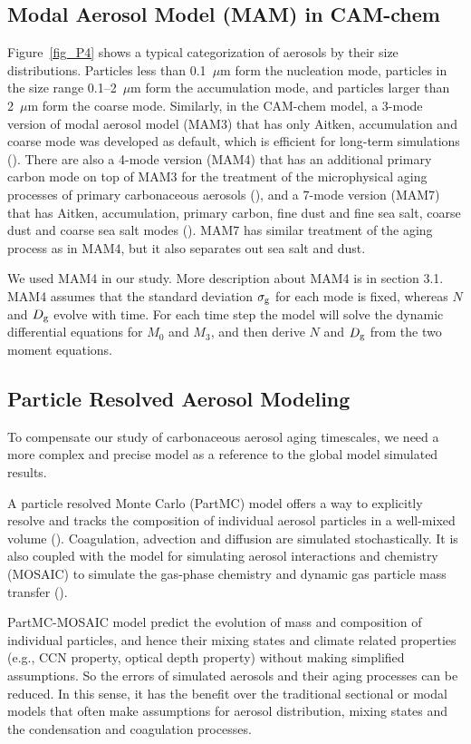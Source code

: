 \documentclass[12pt, fullpage]{uiucthesis2009}
\begin{document}
		\subsection{Modal Aerosol Model (MAM) in CAM-chem}
		Figure~\ref{fig_P4} shows a typical categorization of aerosols by their size distributions. Particles less than 0.1~$\mu$m form the nucleation mode, particles in the size range 0.1--2~$\mu$m form the accumulation mode, and particles larger than 2~$\mu$m form the coarse mode. Similarly, in the CAM-chem model, a 3-mode version of modal aerosol model (MAM3) that has only Aitken, accumulation and coarse mode was developed as default, which is efficient for long-term simulations (\cite{Liu2012}). There are also a 4-mode version (MAM4) that has an additional primary carbon mode on top of MAM3 for the treatment of the microphysical aging processes of primary carbonaceous aerosols (\cite{Liu2016}), and a 7-mode version (MAM7) that has Aitken, accumulation, primary carbon, fine dust and fine sea salt, coarse dust and coarse sea salt modes (\cite{Liu2012}). MAM7 has similar treatment of the aging process as in MAM4, but it also separates out sea salt and dust.
		
		We used MAM4 in our study. More description about MAM4 is in section 3.1. MAM4 assumes that the standard deviation $\sigma_{\rm g}$ for each mode is fixed, whereas $N$ and $D_{\rm g}$ evolve with time. For each time step the model will solve the dynamic differential equations for $M_0$ and $M_3$, and then derive $N$ and $D_{\rm g}$ from the two moment equations.
		
		\subsection{Particle Resolved Aerosol Modeling}
		To compensate our study of carbonaceous aerosol aging timescales, we need a more complex and precise model as a reference to the global model simulated results. 
		
		A particle resolved Monte Carlo (PartMC) model offers a way to explicitly resolve and tracks the composition of individual aerosol particles in a well-mixed volume (\cite{riemer2009simulating}). Coagulation, advection and diffusion are simulated stochastically. It is also coupled with the model for simulating aerosol interactions and chemistry (MOSAIC) to simulate the gas-phase chemistry and dynamic gas particle mass transfer (\cite{zaveri2008model}). 
		
		PartMC-MOSAIC model predict the evolution of mass and composition of individual particles, and hence their mixing states and climate related properties (e.g., CCN property, optical depth property) without making simplified assumptions. So the errors of simulated aerosols and their aging processes can be reduced. In this sense, it has the benefit over the traditional sectional or modal models that often make assumptions for aerosol distribution, mixing states and the condensation and coagulation processes.
		
\end{document}
